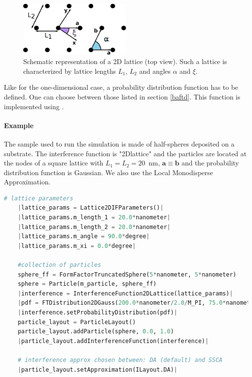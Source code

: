 \begin{figure}[ht]
\begin{center}
\includegraphics[width=0.5\textwidth]{Figures/2Dlattice.eps}
\end{center}
\caption{Schematic representation of a 2D lattice (top view). Such a lattice is characterized by lattice lengths $L_1$, $L_2$ and angles $\alpha$ and $\xi$.}
\label{fig:2dlattice}
\end{figure}

Like for the one-dimensional case, a probability distribution function  has to be defined. One can choose between those listed in section \ref{baftd}. This function is implemented using .%

\paragraph{Example} The sample used to run the simulation is made of half-spheres deposited on a substrate. The interference function is "2Dlattice" and the particles are located at the nodes of a square lattice with $L_1=L_2=20$~nm, $\mathbf{a}\equiv \mathbf{b}$ and the probability distribution function is Gaussian. We also use the Local Monodisperse Approximation. 

\begin{lstlisting}[language=python, style=eclipseboxed,numbers=none,nolol,caption={\Code{Python} script to define a 2DLattice interference function between hemi-spherical particles as well as the Decoupling Approximation in \Code{getSimulation()}.  The part specific to the interferences is marked in red italic font.},label={lst:2dlatticeinterf}]
    # lattice parameters
    |lattice_params = Lattice2DIFParameters()|
    |lattice_params.m_length_1 = 20.0*nanometer|
    |lattice_params.m_length_2 = 20.0*nanometer|
    |lattice_params.m_angle = 90.0*degree|
    |lattice_params.m_xi = 0.0*degree|

    #collection of particles
    sphere_ff = FormFactorTruncatedSphere(5*nanometer, 5*nanometer)
    sphere = Particle(m_particle, sphere_ff)
    |interference = InterferenceFunction2DLattice(lattice_params)|
    |pdf = FTDistribution2DGauss(200.0*nanometer/2.0/M_PI, 75.0*nanometer/2.0/M_PI)|
    |interference.setProbabilityDistribution(pdf)|
    particle_layout = ParticleLayout()
    particle_layout.addParticle(sphere, 0.0, 1.0)
    |particle_layout.addInterferenceFunction(interference)|

    # interference approx chosen between: DA (default) and SSCA
    |particle_layout.setApproximation(ILayout.DA)|
\end{lstlisting}
 
